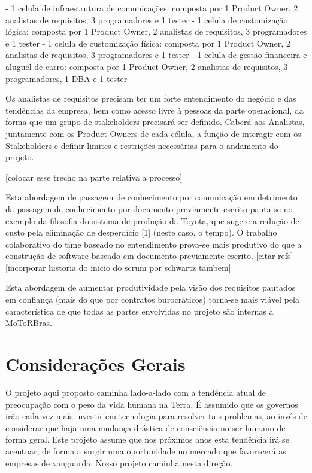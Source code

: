 \documentclass[12pt,journal,compsoc]{IEEEtran}
\begin{document}
- 1 celula de infraestrutura de comunicações: composta por 1 Product Owner, 2 analistas de requisitos, 3 programadores e 1 tester
- 1 celula de customização lógica: composta por 1 Product Owner, 2 analistas de requisitos, 3 programadores e 1 tester
- 1 celula de customização física: composta por 1 Product Owner, 2 analistas de requisitos, 3 programadores e 1 tester
- 1 celula de gestão financeira e aluguel de carro: composta por 1 Product Owner, 2 analistas de requisitos, 3 programadores, 1 DBA e 1 tester 

Os analistas de requisitos precisam ter um forte entendimento do negócio e das tendências da empresa, bem como acesso livre à pessoas da parte operacional, da forma que um grupo de stakeholders precisará ser definido. Caberá aos Analistas, juntamente com os Product Owners de cada célula, a função de interagir com os Stakeholders e definir limites e restrições necessárias para o andamento do projeto.

[colocar esse trecho na parte relativa a processo]

Esta abordagem de passagem de conhecimento por comunicação em detrimento da passagem de conhecimento por documento previamente escrito pauta-se no exemplo da filosofia do sistema de produção da Toyota, que sugere a redução de custo pela eliminação de desperdício [1] (neste caso, o tempo). O trabalho colaborativo do time baseado no entendimento prova-se mais produtivo do que a construção de software baseado em documento previamente escrito. [citar refs] [incorporar historia do inicio do scrum por schwartz tambem]

Esta abordagem de aumentar produtividade pela visão dos requisitos pautados em confiança (mais do que por contratos burocráticos) torna-se mais viável pela característica de que todas as partes envolvidas no projeto são internas à MoToRBras.  



\section{Considerações Gerais}

O projeto aqui proposto caminha lado-a-lado com a tendência atual de preocupação com o peso da vida humana na Terra. É assumido que os governos irão cada vez mais investir em tecnologia para resolver tais problemas, ao invés de considerar que haja uma mudança drástica de consciência no ser humano de forma geral. Este projeto assume que nos próximos anos esta tendência irá se acentuar, de forma a surgir uma oportunidade no mercado que favorecerá as empresas de vanguarda. Nosso projeto caminha nesta direção. 
\end{document}
